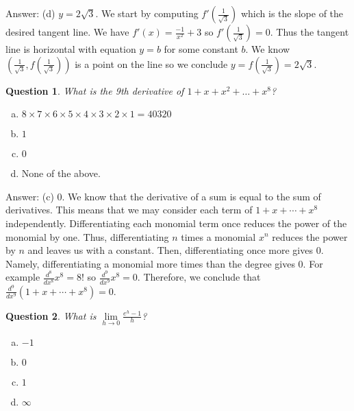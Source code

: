 \documentclass[10pt]{article}
\newtheorem{quiz}{Question}
\begin{document}
\begin{multicols}{2}
\vspace{5mm}

Answer: (d) $y = 2\sqrt{3}$. We start by computing $f'(\frac{1}{\sqrt{3}})$ which is the slope of the desired tangent line. We have $f'(x) = \frac{-1}{x^2} + 3$ so $f'(\frac{1}{\sqrt{3}}) = 0$. Thus the tangent line is horizontal with equation $y = b$ for some constant $b$. We know $(\frac{1}{\sqrt{3}}, f(\frac{1}{\sqrt{3}}))$ is a point on the line so we conclude $y = f(\frac{1}{\sqrt{3}}) = 2\sqrt{3}$.

\vspace{5mm}


\begin{quiz} What is the 9th derivative of $1+x+x^2+\dots+x^8$?
\end{quiz}
\begin {enumerate}[(a)]
\item $8\times 7 \times 6 \times 5 \times 4 \times 3 \times 2 \times 1 = 40320$
\item $1$
\item $0$
\item None of the above.
\end{enumerate}
\vspace{0.5 cm}

Answer: (c) 0. We know that the derivative of a sum is equal to the sum of derivatives. This means that we may consider each term of $1 + x + \cdots + x^8$ independently. Differentiating each monomial term once reduces the power of the monomial by one. Thus, differentiating $n$ times a monomial $x^n$ reduces the power by $n$ and leaves us with a constant. Then, differentiating once more gives 0. Namely, differentiating a monomial more times than the degree gives 0. For example $\frac{d^8}{dx^8}x^8 = 8!$ so $\frac{d^9}{dx^9}x^8 = 0$. Therefore, we conclude that $\frac{d^9}{dx^9}(1 + x + \cdots + x^8) = 0$.  

\vspace{5mm}

\begin{quiz} What is $\lim\limits_{h\to 0} \frac{e^{h} - 1}{h}$?
\end{quiz}
\begin {enumerate}[(a)]
\item $-1$
\item $0$
\item $1$
\item $\infty$
\end{enumerate}

\vspace{0.5 cm}


\end{multicols}
\end{document}
